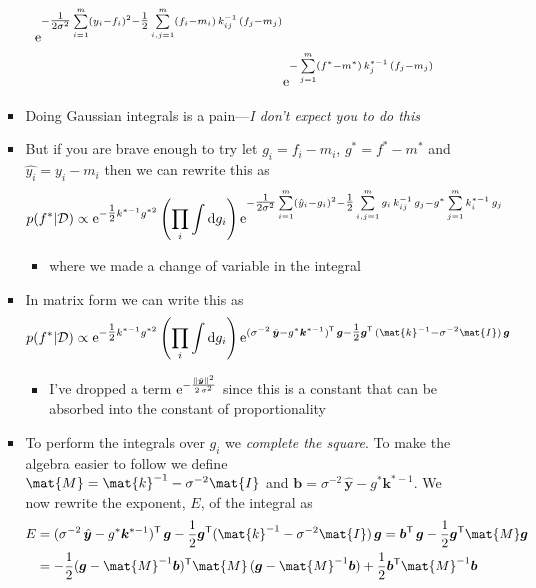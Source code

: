 \documentclass[11pt]{article}
\newcommand{\tr}{\textsf{T}}
\newcommand{\e}[1]{{\rm e}^{#1}}
\newcommand{\dd}{\mathrm{d}}
\begin{document}
\begin{itemize}
\begin{itemize}
\begin{itemize}
\begin{align*}
   \e{- \tfrac{1}{2\sigma^2} \sum\limits_{i=1}^m (y_i-f_i)^2
    -\tfrac{1}{2}\sum\limits_{i,j=1}^m
  (f_i-m_i)\, k^{-1}_{ij}  \, (f_j-m_j)} \\
  & \e{ -\sum\limits_{j=1}^m
  (f^*-m^*)\, k^{*-1}_{j}  \, (f_j-m_j) }
  \end{align*}
\item Doing Gaussian integrals is a pain---\emph{I don't expect you to do this}
\item But if you are brave enough to try let \(g_i=f_i-m_i\), \(g^*=f^*-m^*\) and
\(\hat{y_i} = y_i-m_i\) then we can rewrite this as
$$ p(f^*|\mathcal{D}) \propto \e{-\tfrac{1}{2} k^{*-1}g^{*2}}
           \left(\prod_i \int \dd g_i\right) 
            \e{- \tfrac{1}{2\sigma^2} \sum\limits_{i=1}^m (\hat{y}_i-g_i)^2
             -\tfrac{1}{2}\sum\limits_{i,j=1}^m
           g_i\, k^{-1}_{ij}  \, g_j -  g^* \sum\limits_{j=1}^m k^{*-1}_i \,g_j} $$
\begin{itemize}
\item where we made a change of variable in the integral
\end{itemize}
\item In matrix form we can write this as
$$ p(f^*|\mathcal{D}) \propto \e{-\tfrac{1}{2} k^{*-1}g^{*2}}
         \left(\prod_i \int  \dd g_i\right) 
         \e{(\sigma^{-2}\, \hat{\bm{y}} - g^* \bm{k}^{*-1})^\tr \,\bm{g} -\tfrac{1}{2}
         \bm{g}^\tr \, (\mat{k}^{-1}-\sigma^{-2}\mat{I}) \,\bm{g} } $$
\begin{itemize}
\item I've dropped a term \(\e{-\frac{ \|
           \hat{\bm{y}}\|^2}{2\,\sigma^2}}\) since this is a constant
that can be absorbed into the constant of proportionality
\end{itemize}
\item To perform the integrals over \(g_i\) we \emph{complete the
square}.  To make the algebra easier to follow we define
\(\mat{M}=\mat{k}^{-1}-\sigma^{-2}\mat{I}\) and
\(\bm{b}=\sigma^{-2}\, \hat{\bm{y}} - g^* \bm{k}^{*-1}\).  We
now rewrite  the exponent, \(E\), of the  integral as
\begin{align*}
E &= (\sigma^{-2}\, \hat{\bm{y}} - 
g^* \bm{k}^{*-1})^\tr \,\bm{g} -\frac{1}{2}
\bm{g}^\tr  (\mat{k}^{-1}-\sigma^{-2}\mat{I})\, \bm{g}
=  \bm{b}^\tr \,\bm{g} -\frac{1}{2}
\bm{g}^\tr \mat{M} \bm{g} \\
&=   -\frac{1}{2} (\bm{g} - \mat{M}^{-1}\bm{b})^\tr \mat{M}\,
(\bm{g} - \mat{M}^{-1} \bm{b})
+ \frac{1}{2} \bm{b}^\tr \mat{M}^{-1}\bm{b}
\end{align*}

\end{itemize}
\end{itemize}
\end{itemize}
\end{document}
